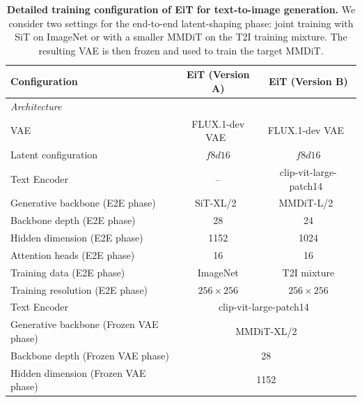 \begin{table}[t]
\centering
\caption{
\textbf{Detailed training configuration of EiT for text-to-image generation.}
We consider two settings for the end-to-end latent-shaping phase:
joint training with SiT on ImageNet or with a smaller MMDiT on the T2I training
mixture. The resulting VAE is then frozen and used to train the target MMDiT.
}
\label{tab:t2i_details}
\scriptsize
\setlength{\tabcolsep}{5pt}
\renewcommand{\arraystretch}{1.10}

\begin{tabular}{lcc}
\toprule
\textbf{Configuration}
& \textbf{EiT (Version A)}
& \textbf{EiT (Version B)} \\
\midrule

\multicolumn{3}{l}{\textit{Architecture}} \\
\midrule

VAE
& FLUX.1-dev VAE~\cite{flux1}
& FLUX.1-dev VAE~\cite{flux1} \\

Latent configuration
& $f8d16$
& $f8d16$ \\

Text Encoder 
& --
& clip-vit-large-patch14~\cite{clip}\\

Generative backbone (E2E phase)
& SiT-XL/2~\cite{sit}
& MMDiT-L/2~\cite{mmdit} \\

Backbone depth (E2E phase)
& 28
& 24 \\

Hidden dimension (E2E phase)
& 1152
& 1024 \\

Attention heads (E2E phase)
& 16
& 16 \\

Training data (E2E phase)
& ImageNet
& T2I mixture \\

Training resolution (E2E phase)
& $256\times256$
& $256\times256$ \\
\midrule
Text Encoder 
& \multicolumn{2}{c}{clip-vit-large-patch14~\cite{clip}}\\

Generative backbone (Frozen VAE phase)
& \multicolumn{2}{c}{MMDiT-XL/2} \\

Backbone depth (Frozen VAE phase)
& \multicolumn{2}{c}{28} \\

Hidden dimension (Frozen VAE phase)
& \multicolumn{2}{c}{1152} \\


\end{tabular}
\end{table}
